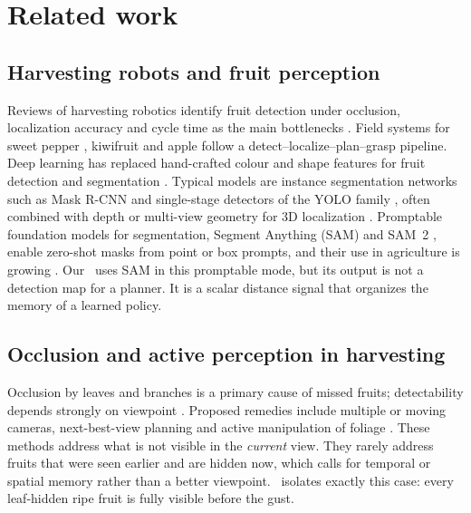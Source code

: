 \section{Related work}
\label{sec:related}

\subsection{Harvesting robots and fruit perception}
Reviews of harvesting robotics identify fruit detection under occlusion, localization accuracy and cycle time as the main bottlenecks \citep{bac2014harvesting,kootstra2021selective,zhou2022intelligent}. Field systems for sweet pepper \citep{arad2020sweetpepper}, kiwifruit \citep{williams2019kiwifruit} and apple \citep{silwal2017apple} follow a detect--localize--plan--grasp pipeline. Deep learning has replaced hand-crafted colour and shape features for fruit detection and segmentation \citep{sa2016deepfruits,kamilaris2018survey,koirala2019review}. Typical models are instance segmentation networks such as Mask R-CNN \citep{he2017maskrcnn} and single-stage detectors of the YOLO family \citep{redmon2016yolo}, often combined with depth or multi-view geometry for 3D localization \citep{gene2020fruit,kang2020apple}. Promptable foundation models for segmentation, Segment Anything (SAM) and SAM~2 \citep{kirillov2023sam,ravi2024sam2}, enable zero-shot masks from point or box prompts, and their use in agriculture is growing . Our \fdm\ uses SAM in this promptable mode, but its output is not a detection map for a planner. It is a scalar distance signal that organizes the memory of a learned policy.

\subsection{Occlusion and active perception in harvesting}
Occlusion by leaves and branches is a primary cause of missed fruits; detectability depends strongly on viewpoint \citep{hemming2014detectability}. Proposed remedies include multiple or moving cameras, next-best-view planning and active manipulation of foliage . These methods address what is not visible in the \emph{current} view. They rarely address fruits that were seen earlier and are hidden now, which calls for temporal or spatial memory rather than a better viewpoint. \bench\ isolates exactly this case: every leaf-hidden ripe fruit is fully visible before the gust.

